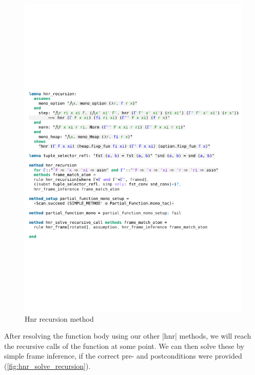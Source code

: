 \begin{figure}[htpb]
    \includegraphics[trim={0 11,6cm 0 15,4cm}, clip, width=1.00\textwidth]{figures/Theory_Hnr_Recursion.pdf}
    \caption[Hnr recursion method]{Hnr recursion method}
    \label{fig:hnr_recursion_method}
\end{figure}

\noindent After resolving the function body using our other |hnr| methods, we will reach the recursive calls of the function at some point. We can then solve these by simple frame inference, if the correct pre- and postconditions were provided (\autoref{fig:hnr_solve_recursion}).

